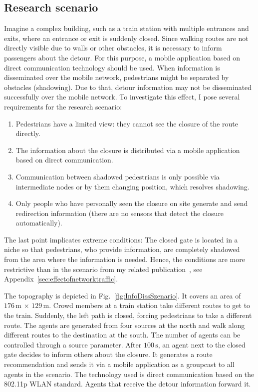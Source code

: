 \subsection{Research scenario}

Imagine a complex building, such as a train station with multiple entrances and exits, where an entrance or exit is suddenly closed. 
Since walking routes are not directly visible due to walls or other obstacles, it is necessary to inform passengers about the detour. For this purpose, a mobile application based on direct communication technology should be used. When information is disseminated over the mobile network, pedestrians might be separated by obstacles (shadowing). Due to that, detour information  may not be disseminated successfully over the mobile network. To investigate this effect, I pose several requirements for the research scenario:


\begin{enumerate}
\item Pedestrians have a limited view: they cannot see the closure of the route directly. 
\item The information about the closure is distributed via a mobile application based on direct communication.
\item Communication between shadowed pedestrians is only possible via intermediate nodes or by them changing position, which resolves shadowing.
\item Only people who have personally seen the closure on site generate and send redirection information (there are no sensors that detect the closure automatically).
\end{enumerate}
The last point implicates extreme conditions: The closed gate is located in a niche so that pedestrians, who provide information, are completely shadowed from the area where the information is needed.
Hence, the conditions are more restrictive than in the scenario from my related publication~\cite{mayr-2021-com}, see Appendix~\ref{sec:effectofnetworktraffic}.


The topography is depicted in Fig.~\ref{fig:InfoDissSzenario}. It covers an area of $176\,\text{m}\,\times \,129\,\text{m}$. Crowd members at a train station take different routes to get to the train. Suddenly, the left path is closed, forcing pedestrians to take a different route.  The agents are generated from four sources at the north and walk along different routes to the destination at the south. The number of agents can be controlled through a source parameter. 
After $100\,\text{s}$, an agent next to the closed gate decides to inform others about the closure. It generates a route recommendation and sends it via a mobile application as a groupcast to all agents in the scenario. The technology used is direct communication based on the 802.11p WLAN standard. Agents that receive the detour information forward it.

